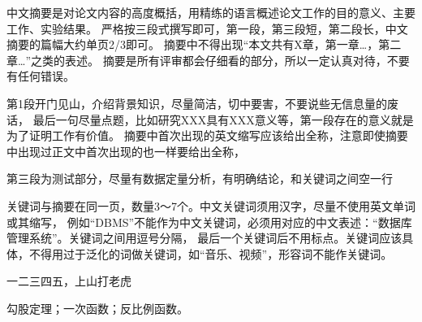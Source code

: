 \abstractch

中文摘要是对论文内容的高度概括，用精练的语言概述论文工作的目的意义、主要工作、实验结果。
严格按三段式撰写即可，第一段，第三段短，第二段长，中文摘要的篇幅大约单页2/3即可。
摘要中不得出现“本文共有X章，第一章…，第二章…”之类的表述。 
摘要是所有评审都会仔细看的部分，所以一定认真对待，不要有任何错误。

第1段开门见山，介绍背景知识，尽量简洁，切中要害，不要说些无信息量的废话，
最后一句尽量点题，比如研究XXX具有XXX意义等，第一段存在的意义就是为了证明工作有价值。
摘要中首次出现的英文缩写应该给出全称，注意即使摘要中出现过正文中首次出现的也一样要给出全称，

第三段为测试部分，尽量有数据定量分析，有明确结论，和关键词之间空一行

关键词与摘要在同一页，数量3～7个。中文关键词须用汉字，尽量不使用英文单词或其缩写，
例如“DBMS”不能作为中文关键词，必须用对应的中文表述：“数据库管理系统”。关键词之间用逗号分隔，
最后一个关键词后不用标点。关键词应该具体，不得用过于泛化的词做关键词，如“音乐、视频”，形容词不能作关键词。

一二三四五，上山打老虎\cite{张立先2011数控机床高速微线段插补算法与自适应前瞻处理}

\vspace{5pt}

\keywordsch 勾股定理；一次函数；反比例函数。
